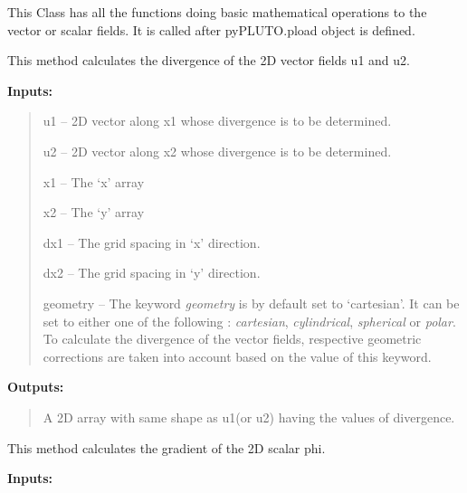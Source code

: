 \documentclass[letterpaper,10pt,english]{sphinxmanual}
\begin{document}
\begin{fulllineitems}
\label{tools:pyPLUTO.Tools}
This Class has all the functions doing basic mathematical
operations to the vector or scalar fields.
It is called after pyPLUTO.pload object is defined.

\begin{fulllineitems}
\label{tools:pyPLUTO.Tools.Div}
This method calculates the divergence of the 2D vector fields u1 and u2.

\textbf{Inputs:}
\begin{quote}

u1 -- 2D vector along x1 whose divergence is to be determined.

u2 -- 2D vector along x2 whose divergence is to be determined.

x1 -- The `x' array

x2 -- The `y' array

dx1 -- The grid spacing in `x' direction.

dx2 -- The grid spacing in `y' direction.

geometry -- The keyword \emph{geometry} is by default set to `cartesian'. It can be set to either one of the following : \emph{cartesian}, \emph{cylindrical}, \emph{spherical} or \emph{polar}. To calculate the divergence of the vector fields, respective geometric corrections are taken into account based on the value of this keyword.
\end{quote}

\textbf{Outputs:}
\begin{quote}

A 2D array with same shape as u1(or u2) having the values of divergence.
\end{quote}

\end{fulllineitems}


\begin{fulllineitems}
\label{tools:pyPLUTO.Tools.Grad}
This method calculates the gradient of the 2D scalar phi.

\textbf{Inputs:}
\begin{quote}


\end{quote}
\end{fulllineitems}
\end{fulllineitems}
\end{document}
